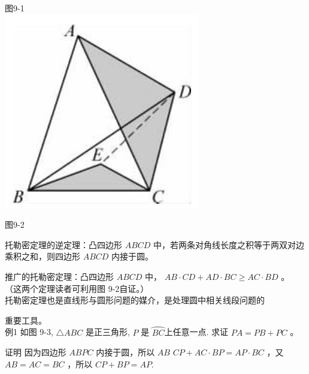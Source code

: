 \documentclass[10pt]{article}
\begin{document}
图9-1\\
\includegraphics[max width=\textwidth, center]{2024_10_30_66b8e5e701da2093c133g-065}

图9-2

托勒密定理的逆定理：凸四边形 $A B C D$ 中，若两条对角线长度之积等于两双对边乘积之和，则四边形 $A B C D$ 内接于圆。

推广的托勒密定理：凸四边形 $A B C D$ 中， $A B \cdot C D+A D \cdot B C \geqslant A C \cdot B D$ 。\\
（这两个定理读者可利用图 9-2自证。）\\
托勒密定理也是直线形与圆形问题的媒介，是处理圆中相关线段问题的

重要工具。\\
例1 如图 9-3, $\triangle A B C$ 是正三角形, $P$ 是 $\overparen{B C}$上任意一点. 求证 $P A=P B+P C$ 。

证明 因为四边形 $A B P C$ 内接于圆，所以 $A B$ $C P+A C \cdot B P=A P \cdot B C$ ，又 $A B=A C=B C$ ，所以 $C P+B P=A P$.
\end{document}
